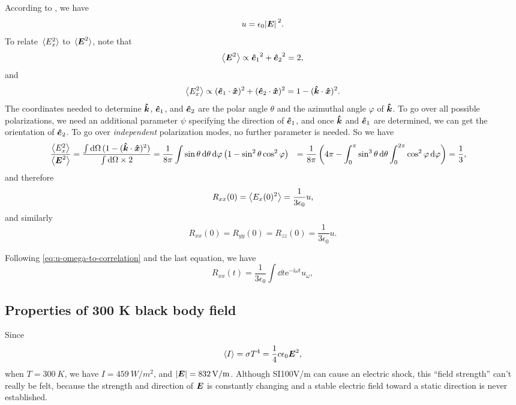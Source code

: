 \documentclass[hyperref, a4paper]{article}
\newcommand*{\ii}{\mathrm{i}}
\newcommand*{\ee}{\mathrm{e}}
\def\\{}%
\begin{document}
According to , 
we have 
\begin{equation}
    u = \epsilon_0 \abs*{\vb*{E}}^2 .
\end{equation}
To relate $\expval*{E_x^2}$ to $\expval*{\vb*{E}^2}$, note that 
\[
    \expval{\vb*{E}^2} \propto {\vu*{e}_1}^2 + {\vu*{e}_2}^2 = 2, 
\]
and 
\[
    \expval{E_x^2} \propto (\vu*{e}_1 \cdot \vu*{x})^2 +  (\vu*{e}_2 \cdot \vu*{x})^2
    = 1 - (\vu*{k} \cdot \vu*{x})^2.
\]
The coordinates needed to determine $\vu*{k}$, $\vu*{e}_1$, and $\vu*{e}_2$ 
are the polar angle $\theta$ and the azimuthal angle $\varphi$ of $\vu*{k}$.
To go over all possible polarizations,
we need an additional parameter $\psi$ specifying the direction of $\vu*{e}_1$,
and once $\vu*{k}$ and $\vu*{e}_1$ are determined,
we can get the orientation of $\vu*{e}_2$.
To go over \emph{independent} polarization modes, 
no further parameter is needed.
So we have 
\[
    \begin{aligned}
        \frac{\expval{E_x^2}}{\expval{\vb*{E}^2}}
        &= \frac{
            \int \dd{\Omega} (1 - (\vu*{k} \cdot \vu*{x})^2)
        }{ \int \dd{\Omega} \times 2 } = \frac{1}{8\pi} \int \sin \theta \dd{\theta} \dd{\varphi} 
        \left(
            1 - \sin^2 \theta \cos^2 \varphi
        \right) \\
        &= \frac{1}{8\pi} \left(
            4\pi - \int_0^\pi \sin^3 \theta \dd{\theta} \int_0^{2\pi} \cos^2 \varphi \dd{\varphi}
        \right) \\
        &= \frac{1}{3},
    \end{aligned}
\]
and therefore 
\begin{equation}
    R_{xx}(0) = \expval{E_x(0)^2} = \frac{1}{3 \epsilon_0} u,  
\end{equation}
and similarly 
\begin{equation}
    R_{xx}(0) = R_{yy}(0) = R_{zz}(0) = \frac{1}{3 \epsilon_0} u.
\end{equation}

Following \eqref{eq:u-omega-to-correlation} and the last equation, we have 
\begin{equation}
    R_{xx} (t) = \frac{1}{3 \epsilon_0} \int \dd{t}  \ee^{- \ii \omega t} u_\omega,
\end{equation}

\subsection{Properties of 300 K black body field}

Since 
\begin{equation}
    \expval{I} = \sigma T^4 = \frac{1}{4} c \epsilon_0 \vb*{E}^2,
\end{equation}
when $T = \SI{300}{K}$, we have 
$I = \SI{459}{W/m^2}$,
and $\abs{\vb*{E}} = \SI{832}{V/m}$.
Although SI{100}{V/m} can cause an electric shock,
this ``field strength'' can't really be felt,
because the strength and direction of $\vb*{E}$ is constantly changing 
and a stable electric field toward a static direction is never established.
\end{document}
